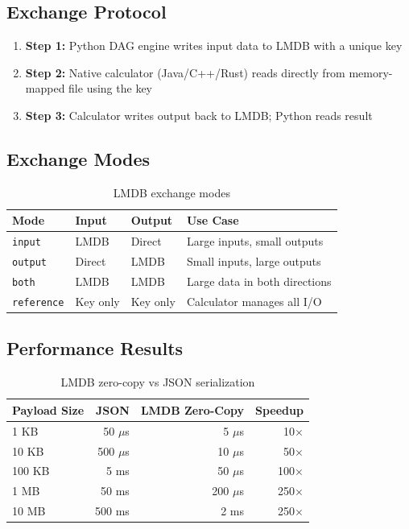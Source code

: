 \documentclass[11pt,a4paper]{article}
\begin{document}
\subsection{Exchange Protocol}

\begin{enumerate}
    \item \textbf{Step 1:} Python DAG engine writes input data to LMDB with a unique key
    \item \textbf{Step 2:} Native calculator (Java/C++/Rust) reads directly from memory-mapped file using the key
    \item \textbf{Step 3:} Calculator writes output back to LMDB; Python reads result
\end{enumerate}

\subsection{Exchange Modes}

\begin{table}[H]
\centering
\caption{LMDB exchange modes}
\begin{tabular}{@{}llll@{}}
\toprule
\textbf{Mode} & \textbf{Input} & \textbf{Output} & \textbf{Use Case} \\
\midrule
\texttt{input} & LMDB & Direct & Large inputs, small outputs \\
\texttt{output} & Direct & LMDB & Small inputs, large outputs \\
\texttt{both} & LMDB & LMDB & Large data in both directions \\
\texttt{reference} & Key only & Key only & Calculator manages all I/O \\
\bottomrule
\end{tabular}
\end{table}

\subsection{Performance Results}

\begin{table}[H]
\centering
\caption{LMDB zero-copy vs JSON serialization}
\begin{tabular}{@{}lrrr@{}}
\toprule
\textbf{Payload Size} & \textbf{JSON} & \textbf{LMDB Zero-Copy} & \textbf{Speedup} \\
\midrule
1 KB & 50 $\mu$s & 5 $\mu$s & 10$\times$ \\
10 KB & 500 $\mu$s & 10 $\mu$s & 50$\times$ \\
100 KB & 5 ms & 50 $\mu$s & 100$\times$ \\
1 MB & 50 ms & 200 $\mu$s & 250$\times$ \\
10 MB & 500 ms & 2 ms & 250$\times$ \\
\bottomrule
\end{tabular}
\end{table}
\end{document}
